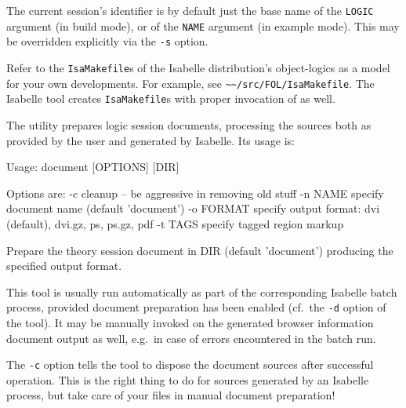 \begin{isabellebody}
\begin{isamarkuptext}
  The current session's identifier is by default just the base name of
  the \verb|LOGIC| argument (in build mode), or of the \verb|NAME| argument (in example mode). This may be overridden explicitly
  via the \verb|-s| option.%
\end{isamarkuptext}%
\isamarkuptrue%
%
\isamarkuptrue%
%
\begin{isamarkuptext}%
Refer to the \verb|IsaMakefile|s of the Isabelle distribution's
  object-logics as a model for your own developments.  For example,
  see \verb|~~/src/FOL/IsaMakefile|.  The Isabelle \hyperlink{tool.mkdir}{\mbox{}} tool creates \verb|IsaMakefile|s with proper invocation
  of \hyperlink{tool.usedir}{\mbox{}} as well.%
\end{isamarkuptext}%
\isamarkuptrue%
%
\isamarkuptrue%
%
\begin{isamarkuptext}%
The \hypertarget{tool.document}{\hyperlink{tool.document}{\mbox{}}} utility prepares logic session documents,
  processing the sources both as provided by the user and generated by
  Isabelle.  Its usage is:
\begin{ttbox}
Usage: document [OPTIONS] [DIR]

  Options are:
    -c           cleanup -- be aggressive in removing old stuff
    -n NAME      specify document name (default 'document')
    -o FORMAT    specify output format: dvi (default), dvi.gz, ps,
                 ps.gz, pdf
    -t TAGS      specify tagged region markup

  Prepare the theory session document in DIR (default 'document')
  producing the specified output format.
\end{ttbox}
  This tool is usually run automatically as part of the corresponding
  Isabelle batch process, provided document preparation has been
  enabled (cf.\ the \verb|-d| option of the \hyperlink{tool.usedir}{\mbox{}}
  tool).  It may be manually invoked on the generated browser
  information document output as well, e.g.\ in case of errors
  encountered in the batch run.

  \medskip The \verb|-c| option tells the \hyperlink{tool.document}{\mbox{}} tool
  to dispose the document sources after successful operation.  This is
  the right thing to do for sources generated by an Isabelle process,
  but take care of your files in manual document preparation!


\end{isamarkuptext}
\end{isabellebody}
